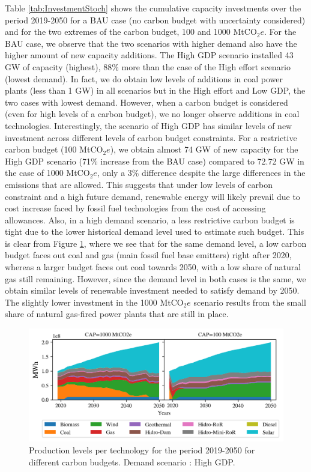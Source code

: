 \documentclass[11pt, letterpaper]{article}
\begin{document}
Table \ref{tab:InvestmentStoch} shows the cumulative capacity investments over the period 2019-2050 for a BAU case (no carbon budget with uncertainty considered) and for the two extremes of the carbon budget, 100 and 1000 MtCO$_2e$. For the BAU case, we observe that the two scenarios with higher demand also have the higher amount of new capacity additions. The High GDP scenario installed 43 GW of capacity (highest), 88\% more than the case of the High effort scenario (lowest demand). In fact, we do obtain low levels of additions in coal power plants (less than 1 GW) in all scenarios but in the High effort and Low GDP, the two cases with lowest demand. However, when a carbon budget is considered (even for high levels of a carbon budget), we no longer observe additions in coal technologies. 
\smallskip
Interestingly, the scenario of High GDP has similar levels of new investment across different levels of carbon budget constraints. For a restrictive carbon budget (100 MtCO$_2e$), we obtain almost 74 GW of new capacity for the High GDP scenario (71\% increase from the BAU case) compared to 72.72 GW in the case of 1000 MtCO$_2e$, only a 3\% difference despite the large differences in the emissions that are allowed. This suggests that under low levels of carbon constraint and a high future demand, renewable energy will likely prevail due to cost increase faced by fossil fuel technologies from the cost of accessing allowances. Also, in a high demand scenario, a less restrictive carbon budget is tight due to the lower historical demand level used to estimate such budget. This is clear from Figure \ref{fig:comp_100_1000}, where we see that for the same demand level, a low carbon budget faces out coal and gas (main fossil fuel base emitters) right after 2020, whereas a larger budget faces out coal towards 2050, with a low share of natural gas still remaining. However, since the demand level in both cases is the same, we obtain similar levels of renewable investment needed to satisfy demand by 2050. The slightly lower investment in the 1000 MtCO$_2e$ scenario results from the small share of natural gas-fired power plants that are still in place. 
\smallskip

\begin{figure}[ht]
\centering
    \includegraphics[width=5.5in]{Figures/auxiliar.png}
\caption{Production levels per technology for the period 2019-2050 for different carbon budgets.  Demand scenario : High GDP.}
  \label{fig:comp_100_1000}
\end{figure}
\end{document}

